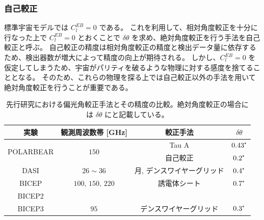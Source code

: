 \documentclass[../../main.tex]{subfiles}
\begin{document}
\subsubsection{自己較正}
標準宇宙モデルでは $C_{l}^{EB}=0$ である。
これを利用して、相対角度較正を十分に行なった上で $C_{l}^{EB} = 0$ とおくことで
$\delta\theta$ を求め、絶対角度較正を行う手法を自己較正と呼ぶ。
自己較正の精度は相対角度較正の精度と検出データ量に依存するため、検出器数が増大によって精度の向上が期待される。
しかし、$C_{l}^{EB}=0$ を仮定してしまうため、宇宙がパリティを破るような物理に対する感度を捨てることとなる。
そのため、これらの物理を探る上では自己較正以外の手法を用いて絶対角度較正を行うことが重要である。

\begin{table}[H]
    \centering
    \caption{先行研究における偏光角較正手法とその精度の比較。絶対角度較正の場合には $\delta\theta$ にと記載している。}
    \begin{tabular}{cccc}
        実験 & 観測周波数帯 [GHz] & 較正手法 & $\delta\theta$ \\
        \hline
        \hline
        \multirow{2}{*}{POLARBEAR\cite{so:polarbear_cal}} & \multirow{2}{*}{$150$} & Tau A & $0.43\tcdegree$ \\
                                                          &                        & 自己較正 & $0.2\tcdegree$ \\
        DASI\cite{so:Leitch_2002} & $26\sim36$ & 月, デンスワイヤーグリッド & $0.4\tcdegree$ \\
        BICEP\cite{so:Takahashi_2008} & $100,\,150,\,220$ & 誘電体シート & $0.7\tcdegree$ \\
        BICEP2\cite{} \\
        BICEP3\cite{so:bicep3_cal} & $95$ & デンスワイヤーグリッド & $0.3\tcdegree$ \\
    \end{tabular}
    \label{tab:so-polarization_calibration}
\end{table}
\end{document}
